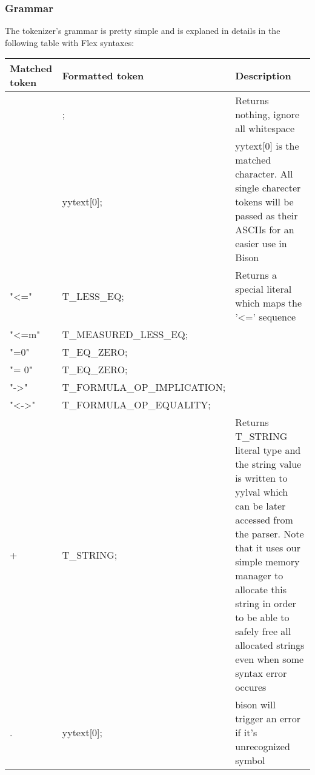 \documentclass{article}
\begin{document}
	\subsubsection*{Grammar}
		The tokenizer's grammar is pretty simple and is explaned in details in the following table with Flex syntaxes:
		\begin{flushleft}
			\begin{tabular}{ | m{7em} | m{15em}| m{10em} | } 
				\hline
					Matched token & Formatted token & Description \\ [0.7ex] 
				\hline
					[ \textbackslash t \textbackslash  n] & ; & Returns nothing, ignore all whitespace \\ 
				\hline
					[,TF01()C\&|~*+-] 	& yytext[0]; & yytext[0] is the matched character. All single charecter tokens will be passed as their ASCIIs for an easier use in Bison \\
				\hline
				    "<="            &   T\_LESS\_EQ; & Returns a special literal which maps the '<=' sequence \\
				\hline
				    "<=m"           &   T\_MEASURED\_LESS\_EQ; & \\
				\hline
				    "=0"            &   T\_EQ\_ZERO; & \\
				\hline
				    "= 0"           &   T\_EQ\_ZERO; & \\
				\hline
				    "->"            &   T\_FORMULA\_OP\_IMPLICATION; & \\
				\hline
				    "<->"           &   T\_FORMULA\_OP\_EQUALITY; & \\
				\hline
				    [a-zA-Z0-9]+    &   T\_STRING; & Returns T\_STRING literal type and the string  value is written to yylval which can be later accessed from the parser. Note that it uses our simple memory manager to allocate this string in order to be able to safely free all allocated strings even when some syntax error occures \\
				\hline
				    .               &   yytext[0]; & bison will trigger an error if it's unrecognized symbol \\
				\hline

			\end{tabular}
		\end{flushleft}
\end{document}

